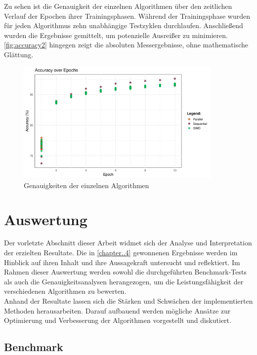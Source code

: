 \documentclass[a4paper, 12pt]{article}
\begin{document}
Zu sehen ist die Genauigkeit der einzelnen Algorithmen über den zeitlichen Verlauf der Epochen 
ihrer Trainingsphasen. Während der Trainingsphase wurden für jeden Algorithmus zehn unabhängige 
Testzyklen durchlaufen. Anschließend wurden die Ergebnisse gemittelt, um potenzielle Ausreißer 
zu minimieren. \autoref{fig:accuracy2} hingegen zeigt die absoluten Messergebnisse, 
ohne mathematische Glättung.

\begin{figure}[H]
    \begin{center}
        \includegraphics[width=10cm]{Bilders/accuracy_plot2.png}
        \caption{Genauigkeiten der einzelnen Algorithmen}
        \label{fig:accuracy2}
    \end{center}
\end{figure}


\newpage %
\clearpage

\section{Auswertung}\label{chapter..5}

Der vorletzte Abschnitt dieser Arbeit widmet sich der Analyse und Interpretation 
der erzielten Resultate. Die in \autoref{chapter..4} gewonnenen Ergebnisse werden im 
Hinblick auf ihren Inhalt und ihre Aussagekraft untersucht und reflektiert. Im 
Rahmen dieser Auswertung werden sowohl die durchgeführten Benchmark-Tests als auch 
die Genauigkeitsanalysen herangezogen, um die Leistungsfähigkeit der verschiedenen 
Algorithmen zu bewerten.\\
Anhand der Resultate lassen sich die Stärken und Schwächen der implementierten 
Methoden herausarbeiten. Darauf aufbauend werden mögliche Ansätze zur Optimierung 
und Verbesserung der Algorithmen vorgestellt und diskutiert.

\subsection{Benchmark}\label{chapter..5.1}
\end{document}
